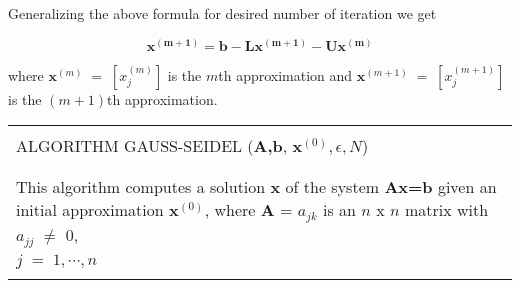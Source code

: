 Generalizing the above formula for desired number of iteration we get

\begin{equation}
\mathrm{\mathbf{x^{(m+1)}=b-Lx^{(m+1)}-Ux^{(m)}}}
\end{equation}

where $\mathrm{\mathbf{x}}^{(m)}\;=\;[x_j^{(m)}]$ is the $m$th approximation and $\mathrm{\mathbf{x}}^{(m+1)}\;=\;\left [x_j^{(m+1)}\right ]$ is the $(m+1)$th approximation. \\

\begin{tabular}{|p{13cm}|}
\hline

\\ALGORITHM GAUSS-SEIDEL (\textbf{A,b}, $\mathrm{\mathbf{x}}^{(0)},\epsilon,N$) \\ \\
\hline \\
This algorithm computes a solution \textbf{x} of the system \textbf{Ax=b} given an initial approximation $\mathrm{\mathbf{x}}^{(0)}$, where \textbf{A} = $a_{jk}$ is an $n$ x $n$ matrix with $a_{jj}\;\neq$ 0, \\$j\;=\;1,\cdots,n$ \\ \\ 


\end{tabular}
